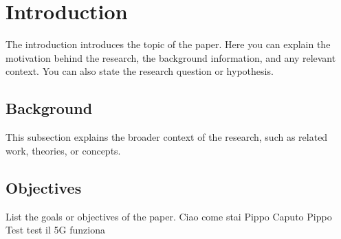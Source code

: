 \section{Introduction}
The introduction introduces the topic of the paper. Here you can explain the motivation behind the research, the background information, and any relevant context. You can also state the research question or hypothesis.

\subsection{Background}
This subsection explains the broader context of the research, such as related work, theories, or concepts.

\subsection{Objectives}
List the goals or objectives of the paper.
Ciao come stai
Pippo Caputo Pippo 
Test test il 5G funziona